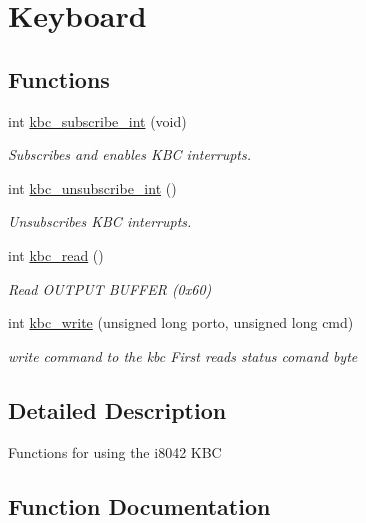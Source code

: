 \hypertarget{group__Keyboard}{}\section{Keyboard}
\label{group__Keyboard}
\subsection*{Functions}
\begin{DoxyCompactItemize}
\item 
int \hyperlink{group__Keyboard_ga9a4aaf9e5cee256ad4af890935f2a976}{kbc\+\_\+subscribe\+\_\+int} (void)
\begin{DoxyCompactList}\small\item\em Subscribes and enables K\+BC interrupts. \end{DoxyCompactList}\item 
int \hyperlink{group__Keyboard_ga0e945987c2233f1c30a645ec5fc750c1}{kbc\+\_\+unsubscribe\+\_\+int} ()
\begin{DoxyCompactList}\small\item\em Unsubscribes K\+BC interrupts. \end{DoxyCompactList}\item 
int \hyperlink{group__Keyboard_ga0028905df4260d371b30e92f547c712a}{kbc\+\_\+read} ()
\begin{DoxyCompactList}\small\item\em Read O\+U\+T\+P\+UT B\+U\+F\+F\+ER (0x60) \end{DoxyCompactList}\item 
int \hyperlink{group__Keyboard_gaed40b556eb233ac6f329eb8396192b6f}{kbc\+\_\+write} (unsigned long porto, unsigned long cmd)
\begin{DoxyCompactList}\small\item\em write command to the kbc First reads status comand byte \end{DoxyCompactList}\end{DoxyCompactItemize}


\subsection{Detailed Description}
Functions for using the i8042 K\+BC 

\subsection{Function Documentation}
